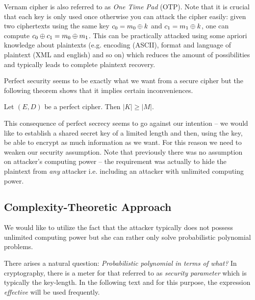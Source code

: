 \begin{note}
	Vernam cipher is also referred to as {\em One Time Pad} (OTP). Note that it is crucial that each key is only used once otherwise you can attack the cipher easily: given two ciphertexts using the same key $c_0=m_0\oplus k$ and $c_1=m_1\oplus k$, one can compute $c_0\oplus c_1 = m_0\oplus m_1$. This can be practically attacked using some apriori knowledge about plaintexts (e.g. encoding (ASCII), format and language of plaintext (XML and english) and so on) which reduces the amount of possibilities and typically leads to complete plaintext recovery.
\end{note}

Perfect security seems to be exactly what we want from a secure cipher but the following theorem shows that it implies certain inconveniences.

\begin{thm}
\label{thm:kgeqm}
	Let $(E,D)$ be a perfect cipher. Then $|K| \geq |M|$.
\end{thm}

\begin{note}
\label{note:intent}
	This consequence of perfect secrecy seems to go against our intention -- we would like to establish a shared secret key of a limited length and then, using the key, be able to encrypt as much information as we want. For this reason we need to weaken our security assumption. Note that previously there was no assumption on attacker's computing power -- the requirement was actually to hide the  plaintext from {\em any} attacker i.e. including an attacker with unlimited computing power.
\end{note}



\subsection{Complexity-Theoretic Approach}

We would like to utilize the fact that the attacker typically does not possess unlimited computing power but she can rather only solve probabilistic polynomial problems.

\begin{note}
\label{note:polyinterms}
	There arises a natural question: {\em Probabilistic polynomial in terms of what?} In cryptography, there is a meter for that referred to as {\em security parameter} which is typically the key-length. In the following text and for this purpose, the expression {\em effective} will be used frequently.
\end{note}

